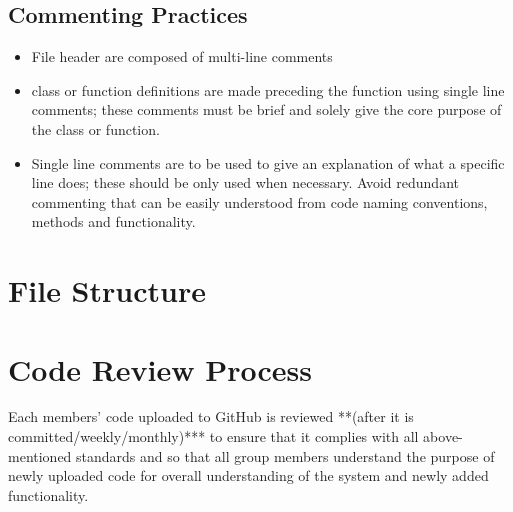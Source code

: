 \documentclass[12pt,a4paper]{article}
\begin{document}
	\subsection*{Commenting Practices}
		\begin{itemize}
			\item File header are composed of multi-line comments
			\item class or function definitions are made preceding the function using single line comments; these comments must be brief and solely give the core purpose of the class or function.
			\item Single line comments are to be used to give an explanation of what a specific line does; these should be only used when necessary. Avoid redundant commenting that can be easily understood from code naming conventions, methods and functionality.
		\end{itemize}
		
		
	\section*{File Structure}
	
	\section*{Code Review Process}
	Each members' code uploaded to GitHub is reviewed **(after it is committed/weekly/monthly)*** to ensure that it complies with all above-mentioned standards and so that all group members understand the purpose of newly uploaded code for overall understanding of the system and newly added functionality. 
	
	
\end{document}
